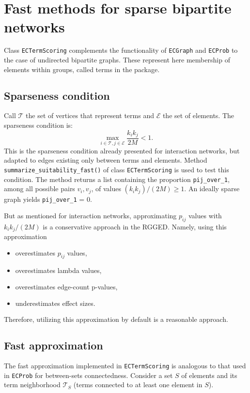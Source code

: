 \documentclass{article}\usepackage[]{graphicx}\usepackage[]{xcolor}
\begin{document}
\section{Fast methods for sparse bipartite networks}

Class \texttt{ECTermScoring} complements the functionality of
\texttt{ECGraph} and \texttt{ECProb} to the case of undirected bipartite graphs. These represent here membership of elements within groups, called terms in the package.

\subsection{Sparseness condition}

Call $\mathcal{T}$ the set of vertices that represent terms and $\mathcal{E}$ the set of elements. The sparseness condition is:
\begin{equation}
\max_{i \in \mathcal{T}, j \in \mathcal{E}} \frac{k_ik_j}{2M} < 1.
\end{equation}
This is the sparseness condition already presented for interaction networks, but adapted to edges existing only between terms and elements. Method \texttt{summarize\_suitability\_fast()} of class \texttt{ECTermScoring} is used to test this condition. The method returns a list containing the proportion \texttt{pij\_over\_1}, among all possible pairs $v_i, v_j$, of values $(k_ik_j)/(2M) \geq 1$. An ideally sparse graph yields \texttt{pij\_over\_1} = 0.

But as mentioned for interaction networks, approximating $p_{ij}$ values with $k_ik_j/(2M)$ is a conservative approach in the RGGED. Namely, using this approximation
\begin{itemize}
\item[-] overestimates $p_{ij}$ values,
\item[-] overestimates lambda values,
\item[-] overestimates edge-count p-values,
\item[-] underestimates effect sizes.
\end{itemize}

Therefore, utilizing this approximation by default is a reasonable approach.

\subsection{Fast approximation}

The fast approximation implemented in \texttt{ECTermScoring} is analogous to that used in \texttt{ECProb} for between-sets connectedness. Consider a set $S$ of elements and its term neighborhood $\mathcal{T}_S$ (terms connected to at least one element in $S$).
\end{document}
